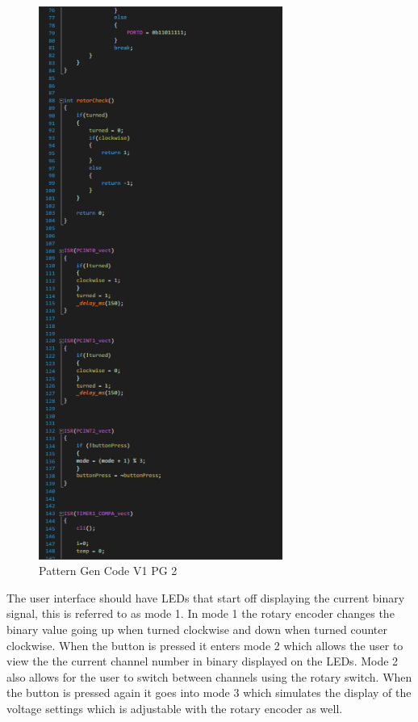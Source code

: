 \documentclass[12pt]{article}
\begin{document}
        \begin{figure}[htp]
            \centering
            \includegraphics[width=8cm]{Pattern Gen Code V1 PG 2.png}
            \caption{Pattern Gen Code V1 PG 2}
        \end{figure}

        \par The user interface should have LEDs that start off displaying the current binary signal, this is referred to as mode 1. In mode 1 the rotary encoder changes the binary value going up when turned clockwise and down when turned counter clockwise. When the button is pressed it enters mode 2 which allows the user to view the the current channel number in binary displayed on the LEDs. Mode 2 also allows for the user to switch between channels using the rotary switch. When the button is pressed again it goes into mode 3 which simulates the display of the voltage settings which is adjustable with the rotary encoder as well.
        
\end{document}
